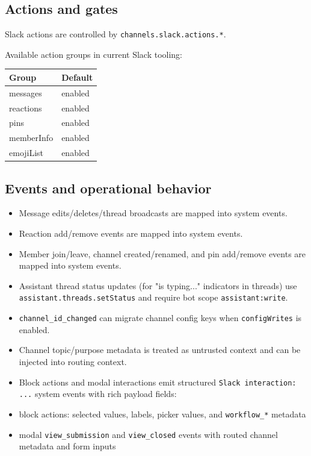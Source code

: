 \subsection{Actions and gates}


Slack actions are controlled by \texttt{channels.slack.actions.*}.

Available action groups in current Slack tooling:


\begin{table}[h]
\centering
\small
\begin{tabular}{|l|l|}
\hline
Group & Default \\
\hline
messages & enabled \\
\hline
reactions & enabled \\
\hline
pins & enabled \\
\hline
memberInfo & enabled \\
\hline
emojiList & enabled \\
\hline
\end{tabular}
\end{table}



\subsection{Events and operational behavior}


\begin{itemize}
  \item Message edits/deletes/thread broadcasts are mapped into system events.
  \item Reaction add/remove events are mapped into system events.
  \item Member join/leave, channel created/renamed, and pin add/remove events are mapped into system events.
  \item Assistant thread status updates (for "is typing..." indicators in threads) use \texttt{assistant.threads.setStatus} and require bot scope \texttt{assistant:write}.
  \item \texttt{channel\_id\_changed} can migrate channel config keys when \texttt{configWrites} is enabled.
  \item Channel topic/purpose metadata is treated as untrusted context and can be injected into routing context.
  \item Block actions and modal interactions emit structured \texttt{Slack interaction: ...} system events with rich payload fields:
  \item block actions: selected values, labels, picker values, and \texttt{workflow\_*} metadata
  \item modal \texttt{view\_submission} and \texttt{view\_closed} events with routed channel metadata and form inputs
\end{itemize}


